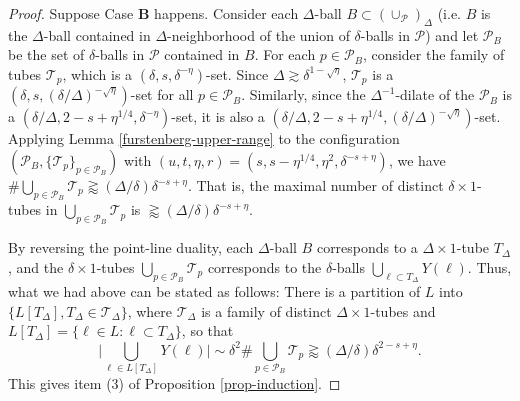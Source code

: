 \documentclass{amsart}
\numberwithin{equation}{section}
\newcommand{\de}{\delta}
\newcommand{\De}{\Delta}
\newcommand{\cp}{\mathcal P}
\newcommand{\cT}{{\mathcal T}}
\begin{document}
\begin{proof}
Suppose Case {\bf B} happens. Consider each $\De$-ball $B\subset(\cup_\cp)_\De$ (i.e. $B$ is the $\Delta$-ball contained in $\Delta$-neighborhood of the union of $\delta$-balls in $\cp$) and let $\cp_B$ be the set of $\delta$-balls in $\cp$ contained in $B$. 
For each $p\in \cp_B$, consider the family of tubes $\cT_p$, which is a $(\de,s, \de^{-\eta})$-set.
Since $\De\gtrsim\de^{1-\sqrt{\eta}}$, 
$\cT_p$ is a $(\de,s, (\de/\De)^{-\sqrt{\eta}})$-set for all $p\in\cp_B$.
Similarly, since the $\De^{-1}$-dilate of the $\cp_B$ is a $(\de/\De, 2-s+\eta^{1/4}, \de^{-\eta})$-set, it is also a $(\de/\De, 2-s+\eta^{1/4}, (\de/\De)^{-\sqrt{\eta}})$-set.
Applying Lemma \ref{furstenberg-upper-range} to the configuration $(\cp_B, \{\cT_p\}_{p\in \cp_B})$ with $(u,t,\eta,r)=(s, s-\eta^{1/4}, \eta^2,\de^{-s+\eta})$, we have $\#\bigcup_{p\in \cp_B}\cT_p\gtrapprox (\De/\de)\de^{-s+\eta}$.
That is, the maximal number of distinct $\de\times1$-tubes in $\bigcup_{p\in \cp_B}\cT_p$ is $\gtrapprox (\De/\de)\de^{-s+\eta}$.


By reversing the point-line duality, each $\De$-ball $B$ corresponds to a $\De\times1$-tube $T_{\De}$, and the $\de\times1$-tubes $\bigcup_{p\in \cp_B}\cT_p$ corresponds to the $\de$-balls $\bigcup_{\ell\subset T_{\De}}Y(\ell)$.
Thus, what we had above can be stated as follows:
There is a partition of $L$ into $\{L[T_{\De}], T_{\De}\in\cT_{\De}\}$, where $\cT_{\De}$ is a family of distinct $\De\times1$-tubes and $L[T_{\De}]=\{\ell\in L: \ell\subset T_\De\}$, so that 
\begin{equation}
\label{big-at-Delta}
    \big|\bigcup_{\ell\in L[T_{\De}]}Y(\ell)\big|\sim\de^2\#\bigcup_{p\in \cp_B}\cT_p\gtrapprox(\De/\de)\de^{2-s+\eta}. 
\end{equation}
This gives item (3) of Proposition \ref{prop-induction}. \qedhere




\end{proof}
\end{document}
